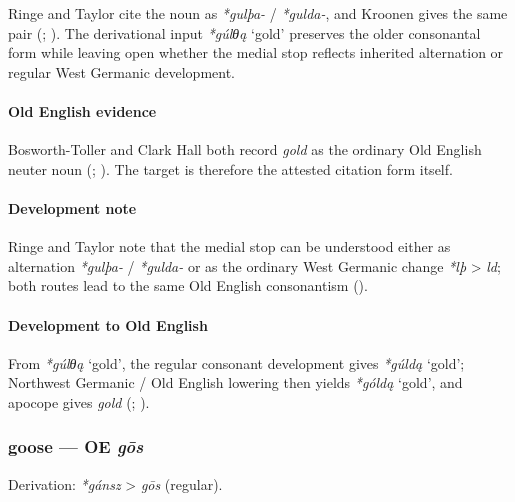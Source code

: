 \documentclass[
  british,
  a4paper,
]{article}
\providecommand{\Recon}[1]{\emph{*#1}}
\begin{document}
Ringe and Taylor cite the noun as \emph{*gulþa-} / \emph{*gulda-}, and
Kroonen gives the same pair (; ). The
derivational input \Recon{gúlθą} `gold' preserves the older consonantal
form while leaving open whether the medial stop reflects inherited
alternation or regular West Germanic development.

\paragraph{Old English evidence}\label{old-english-evidence-24}

Bosworth-Toller and Clark Hall both record \emph{gold} as the ordinary
Old English neuter noun (; ).
The target is therefore the attested citation form itself.

\paragraph{Development note}\label{development-note-1}

Ringe and Taylor note that the medial stop can be understood either as
alternation \emph{*gulþa-} / \emph{*gulda-} or as the ordinary West
Germanic change \emph{*lþ} \textgreater{} \emph{ld}; both routes lead to
the same Old English consonantism ().

\paragraph{Development to Old
English}\label{development-to-old-english-24}

From \Recon{gúlθą} `gold', the regular consonant development gives
\Recon{gúldą} `gold'; Northwest Germanic / Old English lowering then
yields \Recon{góldą} `gold', and apocope gives \emph{gold}
(;
).

\subsubsection{\texorpdfstring{goose --- OE
\emph{gōs}}{goose --- OE gōs}}\label{goose-oe-gux14ds}

Derivation: \emph{*gánsz} \textgreater{} \emph{gōs} (regular).
\end{document}
